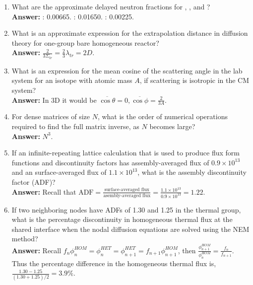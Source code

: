 \documentclass{school-22.211-notes}
\begin{document}
\begin{enumerate}
\begin{enumerate}
  \item What are the approximate delayed neutron fractions for , , and ? \\ 
    \textbf{Answer:} : 0.00665. : 0.01650. : 0.00225. 

  \item What is an approximate expression for the extrapolation distance in diffusion theory for one-group bare homogeneous reactor? \\
    \textbf{Answer:} $\displaystyle \frac{2}{3 \Sigma_{tr}} = \frac{2}{3} \lambda_{tr} = 2D$. 

  \item What is an expression for the mean cosine of the scattering angle in the lab system for an isotope with atomic mass $A$, if scattering is isotropic in the CM system? \\
    \textbf{Answer:} In 3D it would be $\overline{\cos \theta} = 0, \overline{\cos \phi} = \frac{2}{3A}$. 

  \item For dense matrices of size $N$, what is the order of numerical operations required to find the full matrix inverse, as $N$ becomes large? \\
    \textbf{Answer:} $N^3$. 

  \item  If an infinite-repeating lattice calculation that is used to produce flux form functions and discontinuity factors has assembly-averaged flux of $0.9 \times 10^{13}$ and an surface-averaged flux of $1.1 \times 10^{13}$, what is the assembly discontinuity factor (ADF)? \\
    \textbf{Answer:} Recall that $\displaystyle \mathrm{ADF} = \frac{\mbox{surface-averaged flux}}{\mbox{asembly-averaged flux}} = \frac{1.1 \times 10^{13}}{0.9 \times 10^{13}} = 1.22$. 

  \item If two neighboring nodes have ADFs of 1.30 and 1.25 in the thermal group, what is the percentage discontinuity in homogeneous thermal flux at the shared interface when the nodal diffusion equations are solved using the NEM method? \\
    \textbf{Answer:} Recall $\displaystyle f_n \phi_n^{HOM} = \phi_n^{HET} = \phi_{n+1}^{HET} = f_{n+1} \phi_{n+1}^{HOM}$, then $\displaystyle \frac{\phi_{n+1}^{HOM}}{\phi_n^{HOM}} = \frac{f_n}{f_{n+1}}$. Thus the percentage difference in the homogeneous thermal flux is, $\displaystyle \frac{1.30 - 1.25}{(1.30 + 1.25)/2} = 3.9\%$. 

  \end{enumerate}
\end{enumerate}
\end{document}
